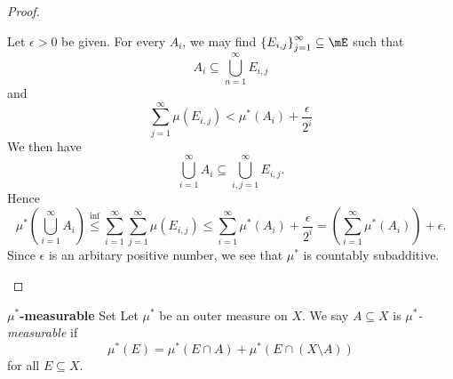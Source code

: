 \documentclass[pmath451]{subfiles}
\begin{document}
\begin{proof}
\begin{enumerate}
                Let $\epsilon>0$ be given. For every $A_i$, we may find $\left\lbrace E_{i,j} \right\rbrace^{\infty}_{j=1}\subseteq\mE$ such that
                \begin{equation*}
                    A_i \subseteq \bigcup^{\infty}_{n=1} E_{i,j}
                \end{equation*}
                and
                \begin{equation*}
                    \sum^{\infty}_{j=1} \mu\left( E_{i,j} \right) < \mu^{*}\left( A_i \right) + \frac{\epsilon}{2^i}
                \end{equation*}
                We then have
                \begin{equation*}
                    \bigcup^{\infty}_{i=1} A_i \subseteq \bigcup^{\infty}_{i,j=1} E_{i,j}.
                \end{equation*}
                Hence
                \begin{equation*}
                    \mu^{*}\left( \bigcup^{\infty}_{i=1} A_i \right) \overset{\text{inf}}{\leq} \sum^{\infty}_{i=1} \sum^{\infty}_{j=1} \mu\left( E_{i,j} \right) \leq \sum^{\infty}_{i=1} \mu^{*}\left( A_i \right) + \frac{\epsilon}{2^i} = \left( \sum^{\infty}_{i=1} \mu^{*}\left( A_i \right) \right) + \epsilon.
                \end{equation*}
                Since $\epsilon$ is an arbitary positive number, we see that $\mu^{*}$ is countably subadditive.
        \end{enumerate}
    \end{proof}

    \clearpage
    
    \begin{definition}{\textbf{$\mu^{*}$-measurable} Set}
        Let $\mu^{*}$ be an outer measure on $X$. We say $A\subseteq X$ is \emph{$\mu^*$-measurable} if
        \begin{equation*}
            \mu^{*}\left( E \right) = \mu^{*}\left( E\cap A \right) + \mu^{*}\left( E\cap \left( X\setminus A \right) \right)
        \end{equation*}
        for all $E\subseteq X$.
    \end{definition}
\end{document}
